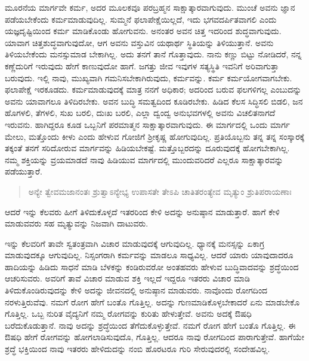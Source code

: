 ಮೂರನೆಯ ಮಾರ್ಗವೇ ಕರ್ಮ, ಅದರ ಮೂಲಕವೂ ಪರಬ್ರಹ್ಮನ ಸಾಕ್ಷಾತ್ಕಾರವಾಗುವುದು. ಮುಂಚೆ ಅವನು ಜ್ಞಾನ ಪಡೆಯಬೇಕೆಂದು ಕರ್ಮಮಾಡುವುದಿಲ್ಲ. ಸುಮ್ಮನೆ ಫಲಾಪೇಕ್ಷೆಯಿಲ್ಲದೆ, ಇದು ಭಗವದರ್ಪಿತವಾಗಲಿ ಎಂದು ಯಜ್ಞದೃಷ್ಟಿಯಿಂದ ಕರ್ಮ ಮಾಡಿಕೊಂಡು ಹೋಗುವನು. ಅನಂತರ ಅವನ ಚಿತ್ತ ಇದರಿಂದ ಶುದ್ಧವಾಗುವುದು. ಯಾವಾಗ ಚಿತ್ತಶುದ್ಧವಾಗುವುದೋ, ಆಗ ಅವನು ವಸ್ತುವಿನ ಯಥಾರ್ಥ ಸ್ಥಿತಿಯನ್ನು ತಿಳಿಯುತ್ತಾನೆ. ಅವನು ತಿಳಿಯಬೇಕೆಂದು ಮನಸ್ಸುಮಾಡ ಬೇಕಾಗಿಲ್ಲ. ಅದು ತನಗೆ ತಾನೆ ಗೊತ್ತಾವುದು. ನಾನು ಕಣ್ಣು ಬಿಟ್ಟು ನೋಡಿದರೆ, ನನ್ನ ಕಣ್ಣೆದುರಿಗೆ ಇರುವುದು ಹೇಗೆ ಕಾಣುವುದೋ ಹಾಗೆ. ಜಗತ್ತು ಜೀವ ಇವುಗಳ ಸತ್ಯಸ್ಥಿತಿ ಇವನಿಗೆ ಅರಿವಾಗುತ್ತಾ ಬರುವುದು. ಇಲ್ಲಿ ನಾವು, ಮುಖ್ಯವಾಗಿ ಗಮನಿಸಬೇಕಾಗಿರುವುದು, ಕರ್ಮವನ್ನು. ಕರ್ಮ ಕರ್ಮಯೋಗವಾಗಬೇಕು. ಫಲಾಪೇಕ್ಷೆ ಇರಕೂಡದು. ಕರ್ಮಮಾಡುವುದಕ್ಕೆ ಮಾತ್ರ ನನಗೆ ಅಧಿಕಾರ; ಅದರಿಂದ ಬರುವ ಫಲಗಳಿಗಲ್ಲ ಎಂಬುದನ್ನು ಅವನು ಯಾವಾಗಲೂ ತಿಳಿದಿರಬೇಕು. ಅವನ ಬುದ್ಧಿ ಸಮತ್ವದಿಂದ ಕೂಡಿರಬೇಕು. ಹಿಡಿದ ಕೆಲಸ ಸಿದ್ಧಿಸಲಿ ಬಿಡಲಿ, ಜನ ಹೊಗಳಲಿ, ತೆಗಳಲಿ, ಸುಖ ಬರಲಿ, ದುಃಖ ಬರಲಿ, ಎಲ್ಲಾ ದ್ವಂದ್ವ ಅನುಭವಗಳಲ್ಲಿ ಅವನು ವಿಚಲಿತನಾಗದೆ ಇರುವನು. ಹಾಗಿದ್ದರೂ ಕೂಡ ಒಬ್ಬನಿಗೆ ಪರಮಾತ್ಮನ ಸಾಕ್ಷಾತ್ಕಾರವಾಗುವುದು. ಈ ಮಾರ್ಗದಲ್ಲಿ ಒಂದು ಮಾರ್ಗ ಮೇಲು, ಮತ್ತೊಂದು ಕೀಳು ಎಂದು ಹೇಳುವ ಗೋಜಿಗೆ ಶ‍್ರೀಕೃಷ್ಣ ಹೋಗುವುದಿಲ್ಲ. ಪ್ರತಿಯೊಬ್ಬನು ತನ್ನ ತನ್ನ ಸಂಸ್ಕಾರಕ್ಕೆ ತಕ್ಕಂತೆ ತನಗೆ ಸರಿದೋರುವ ಮಾರ್ಗವನ್ನು ಹಿಡಿಯಬೇಕಷ್ಟೆ. ಮತ್ತೊಬ್ಬರದನ್ನು ದೂರುವುದಕ್ಕೆ ಹೋಗಬೇಕಾಗಿಲ್ಲ. ನಮ್ಮ ಶಕ್ತಿಯನ್ನು ವ್ರಯಮಾಡದೆ ನಾವು ಹಿಡಿಯುವ ಮಾರ್ಗದಲ್ಲಿ ಮುಂದುವರಿದರೆ ಎಲ್ಲರೂ ಸಾಕ್ಷಾತ್ಕಾರವನ್ನು ಪಡೆಯುತ್ತಾರೆ.

\begin{verse}
ಅನ್ಯೇ ತ್ವೇವಮಜಾನಂತಃ ಶ್ರುತ್ವಾಽನ್ಯೇಭ್ಯ ಉಪಾಸತೇ ತೇಽಪಿ ಚಾತಿತರಂತ್ಯೇವ ಮೃತ್ಯುಂ ಶ್ರುತಿಪರಾಯಣಾಃ 
\end{verse}

{\small ಆದರೆ ಇನ್ನು ಕೆಲವರು ಹೀಗೆ ತಿಳಿದುಕೊಳ್ಳದೆ ಇತರರಿಂದ ಕೇಳಿ ಅದನ್ನು ಅನುಷ್ಠಾನ ಮಾಡುತ್ತಾರೆ. ಹಾಗೆ ಕೇಳಿ ಮಾಡುವವರು ಸಹ ಮೃತ್ಯುವನ್ನು ನಿಜವಾಗಿ ದಾಟುವರು.}

ಇನ್ನು ಕೆಲವರಿಗೆ ತಾವೇ ಸ್ವತಂತ್ರವಾಗಿ ವಿಚಾರ ಮಾಡುವುದಕ್ಕೆ ಆಗುವುದಿಲ್ಲ. ಧ್ಯಾನಕ್ಕೆ ಮನಸ್ಸನ್ನು ಏಕಾಗ್ರ ಮಾಡುವುದಕ್ಕೂ ಆಗುವುದಿಲ್ಲ. ನಿಸ್ಸಂಗರಾಗಿ ಕರ್ಮವನ್ನು ಮಾಡಲೂ ಸಾಧ್ಯವಿಲ್ಲ. ಆದರೆ ಯಾರು ಯಾವುದಾದರೂ ಹಾದಿಯನ್ನು ಹಿಡಿದು ಸಾಧನೆ ಮಾಡಿ ಬೆಳಕನ್ನು ಕಂಡಿರುವರೋ ಅಂತಹವರು ಹೇಳುವ ಬುದ್ಧಿವಾದವನ್ನು ಶ್ರದ್ಧೆಯಿಂದ ಆಚರಿಸುವರು. ಅವರಿಗೆ ತಾವೆ ವಿಚಾರ ಮಾಡುವ ಶಕ್ತಿ ಇಲ್ಲದೆ ಇದ್ದರೂ ಇತರರು ವಿಚಾರ ಮಾಡಿ ತಿಳಿದುಕೊಂಡಿರುವುದನ್ನು ಕೇಳಿ ಅದನ್ನು ಜೀವನದಲ್ಲಿ ಅನುಷ್ಠಾನ ಮಾಡುವರು. ನಾವೊಂದು ರೋಗದಿಂದ ನರಳುತ್ತಿರುವೆವು. ನಮಗೆ ರೋಗ ಹೇಗೆ ಬಂತೊ ಗೊತ್ತಿಲ್ಲ. ಅದನ್ನು ಗುಣಮಾಡಿಕೊಳ್ಳಬೇಕಾದರೆ ಏನು ಮಾಡಬೇಕೊ ಗೊತ್ತಿಲ್ಲ. ಒಬ್ಬ ನುರಿತ ವೈದ್ಯನಿಗೆ ನಮ್ಮ ರೋಗವನ್ನು ಕುರಿತು ಹೇಳುತ್ತೇವೆ. ಅವನು ಅದಕ್ಕೆ ಔಷಧಿ ಬರೆದುಕೊಡುತ್ತಾನೆ. ನಾವು ಅದನ್ನು ಶ್ರದ್ಧೆಯಿಂದ ತೆಗೆದುಕೊಳ್ಳುತ್ತೇವೆ. ನಮಗೆ ರೋಗ ಹೇಗೆ ಬಂತೊ ಗೊತ್ತಿಲ್ಲ. ಈ ಔಷಧಿ ಹೇಗೆ ರೋಗವನ್ನು ಹೋಗಲಾಡಿಸುವುದೊ, ಗೊತ್ತಿಲ್ಲ. ಆದರೂ ನಾವು ರೋಗದಿಂದ ಪಾರಾಗುತ್ತೇವೆ. ಹಾಗೆಯೇ ಶ್ರದ್ಧೆ ಭಕ್ತಿಯಿಂದ ನಾವು ಇತರರು ಹೇಳಿದುದನ್ನು ನಂಬಿ ಹೊರಟರೂ ಗುರಿ ಸೇರುವುದರಲ್ಲಿ ಸಂದೇಹವಿಲ್ಲ.

